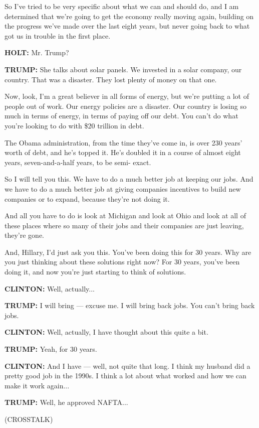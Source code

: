 So I've tried to be very specific about what we can and should do, and I
am determined that we're going to get the economy really moving again,
building on the progress we've made over the last eight years, but never
going back to what got us in trouble in the first place.

\textbf{HOLT:} Mr. Trump?

\textbf{TRUMP:} She talks about solar panels. We invested in a solar
company, our country. That was a disaster. They lost plenty of money on
that one.

Now, look, I'm a great believer in all forms of energy, but we're
putting a lot of people out of work. Our energy policies are a disaster.
Our country is losing so much in terms of energy, in terms of paying off
our debt. You can't do what you're looking to do with \$20 trillion in
debt.

The Obama administration, from the time they've come in, is over 230
years' worth of debt, and he's topped it. He's doubled it in a course of
almost eight years, seven-and-a-half years, to be semi- exact.

So I will tell you this. We have to do a much better job at keeping our
jobs. And we have to do a much better job at giving companies incentives
to build new companies or to expand, because they're not doing it.

And all you have to do is look at Michigan and look at Ohio and look at
all of these places where so many of their jobs and their companies are
just leaving, they're gone.

And, Hillary, I'd just ask you this. You've been doing this for 30
years. Why are you just thinking about these solutions right now? For 30
years, you've been doing it, and now you're just starting to think of
solutions.

\textbf{CLINTON:} Well, actually...

\textbf{TRUMP:} I will bring --- excuse me. I will bring back jobs. You
can't bring back jobs.

\textbf{CLINTON:} Well, actually, I have thought about this quite a bit.

\textbf{TRUMP:} Yeah, for 30 years.

\textbf{CLINTON:} And I have --- well, not quite that long. I think my
husband did a pretty good job in the 1990s. I think a lot about what
worked and how we can make it work again...

\textbf{TRUMP:} Well, he approved NAFTA...

(CROSSTALK)

